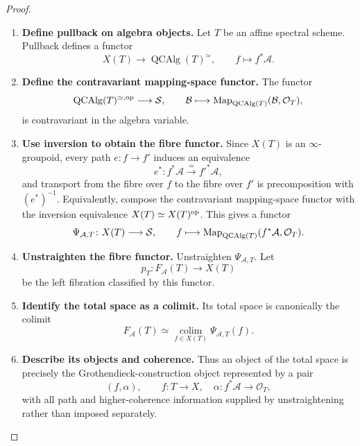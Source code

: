 \begin{proof}
\leavevmode
\begin{enumerate}[label=\textup{(\arabic*)}]
    \item \textbf{Define pullback on algebra objects.}
    Let \(T\) be an affine spectral scheme. Pullback defines a functor
    \[
        X(T)
        \longrightarrow
        \operatorname{QCAlg}(T)^\simeq,
        \qquad
        f\longmapsto f^*\mathcal A.
    \]

    \item \textbf{Define the contravariant mapping-space functor.}
    The functor
    \[
        \operatorname{QCAlg}(T)^{\simeq,\mathrm{op}}
        \longrightarrow
        \mathcal S,
        \qquad
        \mathcal B
        \longmapsto
        \operatorname{Map}_{\operatorname{QCAlg}(T)}(\mathcal B,\mathcal O_T),
    \]
    is contravariant in the algebra variable.

    \item \textbf{Use inversion to obtain the fibre functor.}
    Since \(X(T)\) is an
    \(\infty\)-groupoid, every path \(e:f\to f'\) induces an equivalence
    \[
        e^*:f^*\mathcal A\xrightarrow{\simeq}f'^*\mathcal A,
    \]
    and transport from the fibre over \(f\) to the fibre over \(f'\) is
    precomposition with \((e^*)^{-1}\). Equivalently, compose the
    contravariant mapping-space functor with the inversion equivalence
    \(X(T)\simeq X(T)^{\mathrm{op}}\). This gives a functor
    \[
        \Psi_{\mathcal A,T}
        \colon
        X(T)\longrightarrow\mathcal S,
        \qquad
        f\longmapsto
        \operatorname{Map}_{\operatorname{QCAlg}(T)}
        (f^*\mathcal A,\mathcal O_T).
    \]

    \item \textbf{Unstraighten the fibre functor.}
    Unstraighten \(\Psi_{\mathcal A,T}\). Let
    \[
        p_T:F_{\mathcal A}(T)\longrightarrow X(T)
    \]
    be the left fibration classified by this functor.

    \item \textbf{Identify the total space as a colimit.}
    Its total space is
    canonically the colimit
    \[
        F_{\mathcal A}(T)
        \simeq
        \operatorname*{colim}_{f\in X(T)}
        \Psi_{\mathcal A,T}(f).
    \]

    \item \textbf{Describe its objects and coherence.}
    Thus an object of the total space is precisely the Grothendieck-construction
    object represented by a pair
    \[
        (f,\alpha),
        \qquad
        f:T\to X,
        \quad
        \alpha:f^*\mathcal A\to\mathcal O_T,
    \]
    with all path and higher-coherence information supplied by
    unstraightening rather than imposed separately.


\end{enumerate}
\end{proof}
